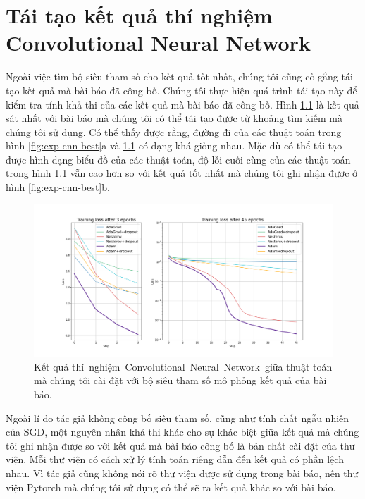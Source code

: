 \chapter{Tái tạo kết quả thí nghiệm Convolutional Neural Network}
\label{Appendix2}

Ngoài việc tìm bộ siêu tham số cho kết quả tốt nhất, chúng tôi cũng cố gắng tái tạo kết quả mà bài báo đã công bố. Chúng tôi thực hiện quá trình tái tạo này để kiểm tra tính khả thi của các kết quả mà bài báo đã công bố. Hình \ref{fig:exp-cnn-rep} là kết quả sát nhất với bài báo mà chúng tôi có thể tái tạo được từ khoảng tìm kiếm mà chúng tôi sử dụng. Có thể thấy được rằng, đường đi của các thuật toán trong hình \ref{fig:exp-cnn-best}a và \ref{fig:exp-cnn-rep} có dạng khá giống nhau. Mặc dù có thể tái tạo được hình dạng biểu đồ của các thuật toán, độ lỗi cuối cùng của các thuật toán trong hình \ref{fig:exp-cnn-rep} vẫn cao hơn so với kết quả tốt nhất mà chúng tôi ghi nhận được ở hình \ref{fig:exp-cnn-best}b.

\begin{figure}[htp]
	\centering
	\includegraphics[width=140 mm]{images/cnn-rep.png}
	\caption{Kết quả thí nghiệm Convolutional Neural Network giữa thuật toán mà chúng tôi cài đặt với bộ siêu tham số mô phỏng kết quả của bài báo.}
	\label{fig:exp-cnn-rep}
\end{figure}

Ngoài lí do tác giả không công bố siêu tham số, cũng như tính chất ngẫu nhiên của SGD, một nguyên nhân khả thi khác cho sự khác biệt giữa kết quả mà chúng tôi ghi nhận được so với kết quả mà bài báo công bố là bản chất cài đặt của thư viện. Mỗi thư viện có cách xử lý tính toán riêng dẫn đến kết quả có phần lệch nhau. Vì tác giả cũng không nói rõ thư viện được sử dụng trong bài báo, nên thư viện Pytorch mà chúng tôi sử dụng có thể sẽ ra kết quả khác so với bài báo.